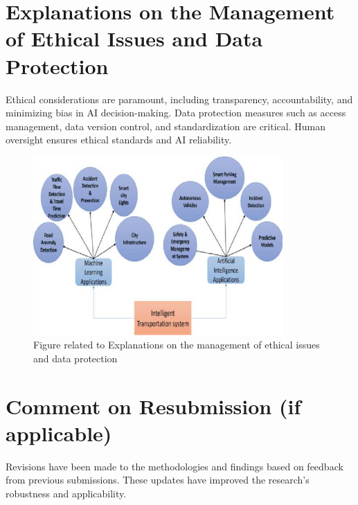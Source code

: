 \documentclass[12pt]{article}
\begin{document}
\section{Explanations on the Management of Ethical Issues and Data Protection}
Ethical considerations are paramount, including transparency, accountability, and minimizing bias in AI decision-making. Data protection measures such as access management, data version control, and standardization are critical. Human oversight ensures ethical standards and AI reliability.

\begin{figure}[htbp]
    \centering
    \includegraphics[width=0.85\textwidth]{images/explanations_on_the_management_of_ethical_issues_and_data_protection_img_1.png}
    \caption{Figure related to Explanations on the management of ethical issues and data protection}
    \label{fig:explanations_on_the_management_of_ethical_issues_and_data_protection_1}
\end{figure}

\section{Comment on Resubmission (if applicable)}
Revisions have been made to the methodologies and findings based on feedback from previous submissions. These updates have improved the research's robustness and applicability.
\end{document}
